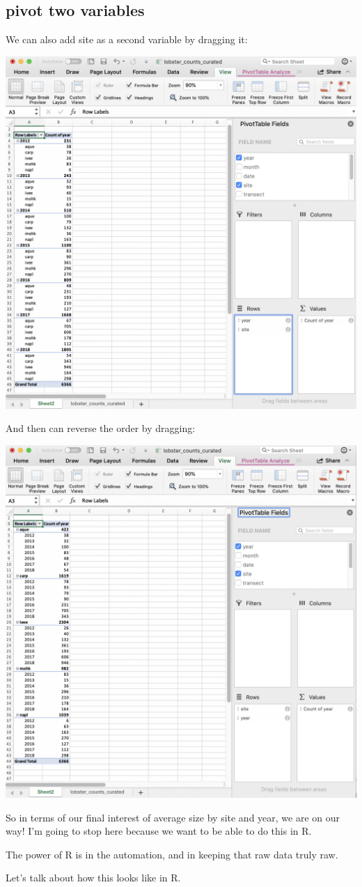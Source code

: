 \documentclass[]{book}
\begin{document}
\hypertarget{pivot-two-variables}{%
\subsection{pivot two variables}\label{pivot-two-variables}}

We can also add site as a second variable by dragging it:

\includegraphics[width=0.6\linewidth]{img/pivot-table-count-year-site}

And then can reverse the order by dragging:

\includegraphics[width=0.6\linewidth]{img/pivot-table-count-site-year}

So in terms of our final interest of average size by site and year, we are on our way! I'm going to stop here because we want to be able to do this in R.

The power of R is in the automation, and in keeping that raw data truly raw.

Let's talk about how this looks like in R.
\end{document}
